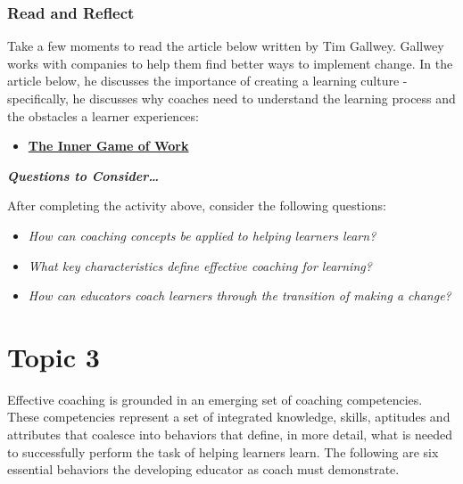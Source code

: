 \documentclass[
]{book}
\providecommand{\tightlist}{%
  \setlength{\itemsep}{0pt}\setlength{\parskip}{0pt}}
\begin{document}
\begin{reflect}
\hypertarget{read-and-reflect-2}{%
\subsubsection*{Read and Reflect}\label{read-and-reflect-2}}

Take a few moments to read the article below written by Tim Gallwey. Gallwey works with companies to help them find better ways to implement change. In the article below, he discusses the importance of creating a learning culture - specifically, he discusses why coaches need to understand the learning process and the obstacles a learner experiences:

\begin{itemize}
\tightlist
\item
  \href{https://thesystemsthinker.com/the-inner-game-of-work-building-capability-in-the-workplace/}{\textbf{The Inner Game of Work}}
\end{itemize}

\textbf{\emph{Questions to Consider\ldots{}}}

After completing the activity above, consider the following questions:

\begin{itemize}
\tightlist
\item
  \emph{How can coaching concepts be applied to helping learners learn?}
\item
  \emph{What key characteristics define effective coaching for learning?}
\item
  \emph{How can educators coach learners through the transition of making a change?}
\end{itemize}
\end{reflect}

\hypertarget{topic-3}{%
\section*{Topic 3}\label{topic-3}}

Effective coaching is grounded in an emerging set of coaching competencies. These competencies represent a set of integrated knowledge, skills, aptitudes and attributes that coalesce into behaviors that define, in more detail, what is needed to successfully perform the task of helping learners learn. The following are six essential behaviors the developing educator as coach must demonstrate.
\end{document}
